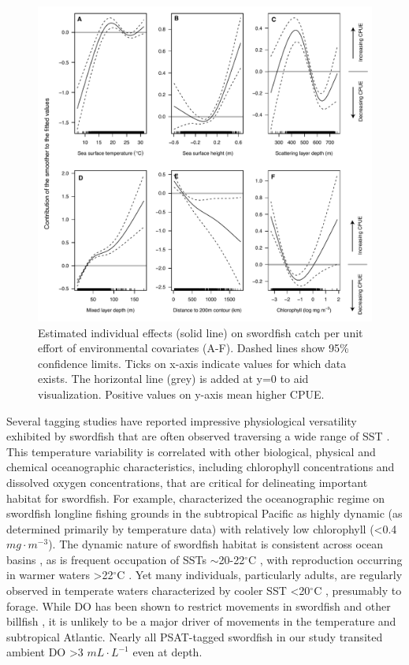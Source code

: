 \begin{figure}[htbp]
\centering
\includegraphics[width=\textwidth]{images/C4_Fig6.pdf}
\caption[Estimated individual effects on swordfish catch per unit effort of environmental covariates in an additive model framework]{Estimated individual effects (solid line) on swordfish catch per unit effort of environmental covariates (A-F). Dashed lines show 95\% confidence limits. Ticks on x-axis indicate values for which data exists. The horizontal line (grey) is added at y=0 to aid visualization. Positive values on y-axis mean higher CPUE.}
\label{fig:c4f6}
\end{figure}

Several tagging studies have reported impressive physiological versatility exhibited by swordfish that are often observed traversing a wide range of SST \citep{Abecassis2012}. This temperature variability is correlated with other biological, physical and chemical oceanographic characteristics, including chlorophyll concentrations and dissolved oxygen concentrations, that are critical for delineating important habitat for swordfish. For example, \citet{Seki2002} characterized the oceanographic regime on swordfish longline fishing grounds in the subtropical Pacific as highly dynamic (as determined primarily by temperature data) with relatively low chlorophyll (<0.4 \(mg \cdot m^{-3}\)). The dynamic nature of swordfish habitat is consistent across ocean basins \citep{Hazin2008, Seki2002, Podesta1993}, as is frequent occupation of SSTs $\sim$20-22$^{\circ}$C \citep{Santos2006}, with reproduction occurring in warmer waters >22$^{\circ}$C \citep{Palko1981, Romeo2011}. Yet many individuals, particularly adults, are regularly observed in temperate waters characterized by cooler SST <20$^{\circ}$C \citep{Evans2014, Abascal2015}, presumably to forage. While DO has been shown to restrict movements in swordfish and other billfish \citep{Stramma2012, Braun2015}, it is unlikely to be a major driver of movements in the temperature and subtropical Atlantic. Nearly all PSAT-tagged swordfish in our study transited ambient DO >3 \(mL \cdot L^{-1}\) even at depth.

